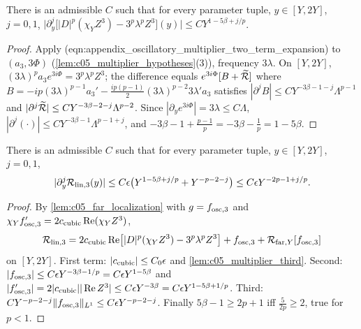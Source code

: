 \begin{lemma}
  \label{lem:c05_multiplier_third}
  There is an admissible $C$ such that for every parameter tuple, $y\in[Y,2Y]$, $j=0,1$,
  $\bigl|\partial_y^j\bigl[|D|^p(\chi_YZ^3)-3^p\lambda^pZ^3\bigr](y)\bigr|\le CY^{1-5\beta+j/p}$.
\end{lemma}
\begin{proof}
  Apply (eqn:appendix\_oscillatory\_multiplier\_two\_term\_expansion) to $(a_3,3\Phi)$ (\cref{lem:c05_multiplier_hypotheses}(3)),
  frequency $3\lambda$. On $[Y,2Y]$, $(3\lambda)^pa_3e^{3i\Phi}=3^p\lambda^pZ^3$; the difference equals $e^{3i\Phi}[B+\widetilde{\mathcal{R}}]$ where
  $B=-ip(3\lambda)^{p-1}a_3'-\frac{ip(p-1)}2(3\lambda)^{p-2}3\lambda'a_3$ satisfies $|\partial^jB|\le CY^{-3\beta-1-j}\Lambda^{p-1}$ and
  $|\partial^j\widetilde{\mathcal{R}}|\le CY^{-3\beta-2-j}\Lambda^{p-2}$. Since $|\partial_ye^{3i\Phi}|=3\lambda\le C\Lambda$,
  $|\partial^j(\cdot)|\le CY^{-3\beta-1}\Lambda^{p-1+j}$, and $-3\beta-1+\frac{p-1}p=-3\beta-\frac1p=1-5\beta$.
\end{proof}

\begin{lemma}
  \label{lem:c05_third_harmonic_bound}
  There is an admissible $C$ such that for every parameter tuple, $y\in[Y,2Y]$, $j=0,1$,
  \begin{equation}\label{eqn:approx_E5_third_harmonic_bound}
    |\partial_y^j\mathcal{R}_{\textup{lin},3}(y)|\le C\epsilon\bigl(Y^{1-5\beta+j/p}+Y^{-p-2-j}\bigr)\le C\epsilon Y^{-2p-1+j/p}.
  \end{equation}
\end{lemma}
\begin{proof}
  By \cref{lem:c05_far_localization} with $g=f_{\textup{osc},3}$ and $\chi_Yf_{\textup{osc},3}'=2c_{\textup{cubic}}\operatorname{Re}(\chi_YZ^3)$,
  \[
    \mathcal{R}_{\textup{lin},3}=2c_{\textup{cubic}}\operatorname{Re}\bigl[|D|^p(\chi_YZ^3)-3^p\lambda^pZ^3\bigr]+f_{\textup{osc},3}+\mathcal{R}_{\textup{far},Y}[f_{\textup{osc},3}]
  \]
  on $[Y,2Y]$. First term: $|c_{\textup{cubic}}|\le C_0\epsilon$ and \cref{lem:c05_multiplier_third}. Second:
  $|f_{\textup{osc},3}|\le C\epsilon Y^{-3\beta-1/p}=C\epsilon Y^{1-5\beta}$ and $|f'_{\textup{osc},3}|=2|c_{\textup{cubic}}||\operatorname{Re}Z^3|\le C\epsilon Y^{-3\beta}=C\epsilon Y^{1-5\beta+1/p}$.
  Third: $CY^{-p-2-j}\|f_{\textup{osc},3}\|_{L^1}\le C\epsilon Y^{-p-2-j}$. Finally $5\beta-1\ge2p+1$ iff $\frac{5}{2p}\ge2$, true for $p<1$.
\end{proof}

